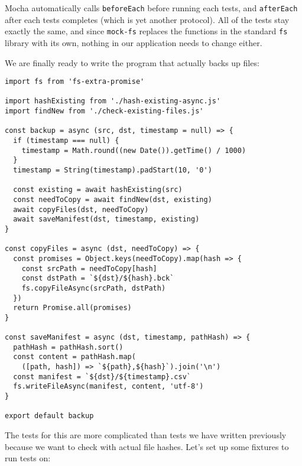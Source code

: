 \documentclass[krantzl]{krantz}
\begin{document}
\noindent Mocha automatically calls \texttt{beforeEach} before running each tests,
and \texttt{afterEach} after each tests completes
(which is yet another protocol).
All of the tests stay exactly the same,
and since \texttt{mock-fs} replaces the functions in the standard \texttt{fs} library with its own,
nothing in our application needs to change either.


We are finally ready to write the program that actually backs up files:


\begin{lstlisting}[frame=tblr]
import fs from 'fs-extra-promise'

import hashExisting from './hash-existing-async.js'
import findNew from './check-existing-files.js'

const backup = async (src, dst, timestamp = null) => {
  if (timestamp === null) {
    timestamp = Math.round((new Date()).getTime() / 1000)
  }
  timestamp = String(timestamp).padStart(10, '0')

  const existing = await hashExisting(src)
  const needToCopy = await findNew(dst, existing)
  await copyFiles(dst, needToCopy)
  await saveManifest(dst, timestamp, existing)
}

const copyFiles = async (dst, needToCopy) => {
  const promises = Object.keys(needToCopy).map(hash => {
    const srcPath = needToCopy[hash]
    const dstPath = `${dst}/${hash}.bck`
    fs.copyFileAsync(srcPath, dstPath)
  })
  return Promise.all(promises)
}

const saveManifest = async (dst, timestamp, pathHash) => {
  pathHash = pathHash.sort()
  const content = pathHash.map(
    ([path, hash]) => `${path},${hash}`).join('\n')
  const manifest = `${dst}/${timestamp}.csv`
  fs.writeFileAsync(manifest, content, 'utf-8')
}

export default backup
\end{lstlisting}



The tests for this are more complicated than tests we have written previously
because we want to check with actual file hashes.
Let’s set up some fixtures to run tests on:
\end{document}
